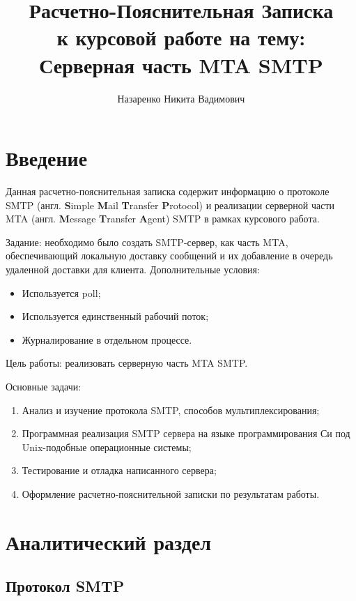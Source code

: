 \documentclass[a4paper,12pt]{report}
\title{Расчетно-Пояснительная Записка \\ 
    \large к курсовой работе на тему: \\ Серверная часть MTA SMTP}
\author{Назаренко Никита Вадимович}
\begin{document}
\maketitle


\tableofcontents

\newpage
{}
\chapter*{Введение}

Данная расчетно-пояснительная записка содержит информацию о протоколе SMTP (англ. \textbf{S}imple \textbf{M}ail \textbf{T}ransfer \textbf{P}rotocol) и реализации серверной части MTA (англ. \textbf{M}essage \textbf{T}ransfer \textbf{A}gent) SMTP в рамках курсового работа.

Задание: необходимо было создать SMTP-сервер, как часть MTA, обеспечивающий локальную доставку сообщений и их добавление в очередь удаленной доставки для клиента. Дополнительные условия:
\begin{itemize}
\item Используется poll;
\item Используется единственный рабочий поток;
\item Журналирование в отдельном процессе.
\end{itemize}

Цель работы: реализовать серверную часть MTA SMTP.

Основные задачи:
\begin{enumerate}
    \item Анализ и изучение протокола SMTP, способов мультиплексирования;
    \item Программная реализация SMTP сервера на языке программирования Си под Unix-подобные операционные системы;
    \item Тестирование и отладка написанного сервера;
    \item Оформление расчетно-пояснительной записки по результатам работы.
\end{enumerate}


\chapter{Аналитический раздел}


\section{Протокол SMTP}
\end{document}
